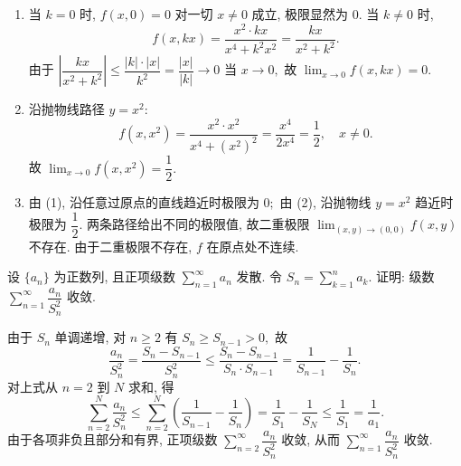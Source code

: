 \begin{solution}
\begin{enumerate}
\item 当 $k = 0$ 时, $f(x, 0) = 0$ 对一切 $x \neq 0$ 成立, 极限显然为 $0.$ 当 $k \neq 0$ 时,
\begin{equation*}
f(x, kx) = \frac{x^2 \cdot kx}{x^4 + k^2 x^2} = \frac{kx}{x^2 + k^2}.
\end{equation*}
由于 $\left|\dfrac{kx}{x^2 + k^2}\right| \leqslant \dfrac{|k| \cdot |x|}{k^2} = \dfrac{|x|}{|k|} \to 0$ 当 $x \to 0,$ 故 $\displaystyle\lim_{x\to 0} f(x, kx) = 0.$

\item 沿抛物线路径 $y = x^2$:
\begin{equation*}
f(x, x^2) = \frac{x^2 \cdot x^2}{x^4 + (x^2)^2} = \frac{x^4}{2x^4} = \frac{1}{2}, \quad x \neq 0.
\end{equation*}
故 $\displaystyle\lim_{x \to 0} f(x, x^2) = \dfrac{1}{2}.$

\item 由 (1), 沿任意过原点的直线趋近时极限为 $0;$ 由 (2), 沿抛物线 $y = x^2$ 趋近时极限为 $\dfrac{1}{2}.$ 两条路径给出不同的极限值, 故二重极限 $\displaystyle\lim_{(x,y)\to(0,0)} f(x,y)$ 不存在. 由于二重极限不存在, $f$ 在原点处不连续.
\end{enumerate}
\end{solution}


\begin{question}[points = 10]
设 $\{a_n\}$ 为正数列, 且正项级数 $\displaystyle\sum_{n=1}^\infty a_n$ 发散. 令 $S_n = \sum_{k=1}^n a_k.$ 证明: 级数 $\displaystyle\sum_{n=1}^\infty \dfrac{a_n}{S_n^2}$ 收敛.

\end{question}

\begin{solution}
由于 $S_n$ 单调递增, 对 $n \geqslant 2$ 有 $S_n \geqslant S_{n-1} > 0,$ 故
\begin{equation*}
\frac{a_n}{S_n^2} = \frac{S_n - S_{n-1}}{S_n^2} \leqslant \frac{S_n - S_{n-1}}{S_n \cdot S_{n-1}} = \frac{1}{S_{n-1}} - \frac{1}{S_n}.
\end{equation*}
对上式从 $n = 2$ 到 $N$ 求和, 得
\begin{equation*}
\sum_{n=2}^N \frac{a_n}{S_n^2} \leqslant \sum_{n=2}^N \left( \frac{1}{S_{n-1}} - \frac{1}{S_n} \right) = \frac{1}{S_1} - \frac{1}{S_N} \leqslant \frac{1}{S_1} = \frac{1}{a_1}.
\end{equation*}
由于各项非负且部分和有界, 正项级数 $\displaystyle\sum_{n=2}^\infty \dfrac{a_n}{S_n^2}$ 收敛, 从而 $\displaystyle\sum_{n=1}^\infty \dfrac{a_n}{S_n^2}$ 收敛.
\end{solution}


